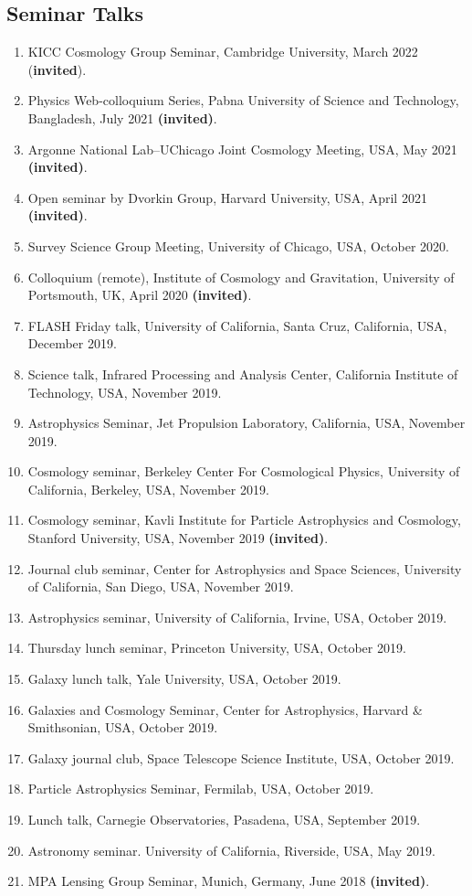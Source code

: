 \documentclass[margin, line]{res}
\begin{document}
\begin{resume}
\section{\sc Seminar Talks}
\begin{enumerate}
	\item KICC Cosmology Group Seminar, Cambridge University, March 2022 (\textbf{invited}).
	\item Physics Web-colloquium Series, Pabna University of Science and Technology, Bangladesh, July 2021 \textbf{(invited)}.
	\item Argonne National Lab--UChicago Joint Cosmology Meeting, USA, May 2021 \textbf{(invited)}.
	\item Open seminar by Dvorkin Group, Harvard University, USA, April 2021 \textbf{(invited)}.
	\item Survey Science Group Meeting, University of Chicago, USA, October 2020.
	\item Colloquium (remote), Institute of Cosmology and Gravitation, University of Portsmouth, UK, April 2020 \textbf{(invited)}.
	\item FLASH Friday talk, University of California, Santa Cruz, California, USA, December 2019.
	\item Science talk, Infrared Processing and Analysis Center, California Institute of Technology, USA, November 2019.
	\item Astrophysics Seminar, Jet Propulsion Laboratory, California, USA, November 2019.
	\item Cosmology seminar, Berkeley Center For Cosmological Physics, University of California, Berkeley, USA, November 2019. 
	\item Cosmology seminar, Kavli Institute for Particle Astrophysics and Cosmology, Stanford University, USA, November 2019 \textbf{(invited)}.
	\item Journal club seminar, Center for Astrophysics and Space Sciences, University of California, San Diego, USA, November 2019.
	\item Astrophysics seminar, University of California, Irvine, USA, October 2019.
	\item Thursday lunch seminar, Princeton University, USA, October 2019.
	\item Galaxy lunch talk, Yale University, USA, October 2019.
	\item Galaxies and Cosmology Seminar, Center for Astrophysics, Harvard \& Smithsonian, USA, October 2019.
	\item Galaxy journal club, Space Telescope Science Institute, USA, October 2019.
	\item Particle Astrophysics Seminar, Fermilab, USA, October 2019.
	\item Lunch talk, Carnegie Observatories, Pasadena, USA, September 2019.
	\item Astronomy seminar. University of California, Riverside, USA, May 2019. 
	\item MPA Lensing Group Seminar, Munich, Germany, June 2018 \textbf{(invited)}.
\end{enumerate}



\end{resume}
\end{document}
